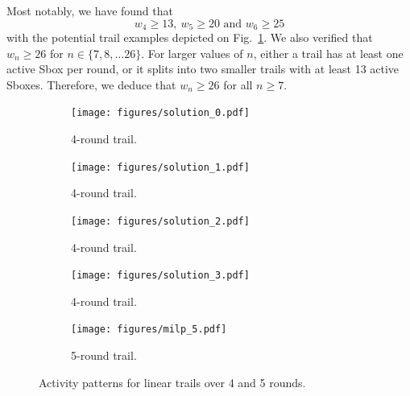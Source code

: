 Most notably, we have found that
\[w_4 \geq 13,\  w_5 \geq 20 \mbox{ and } w_6 \geq 25\]
with the potential trail examples depicted on Fig.~\ref{fig:trails}.
We also verified that \(w_n \geq 26\) for $n \in \{7, 8, \ldots 26\}$.
For larger values of $n$, either a trail has at least one active Sbox per
round, or it splits into two smaller trails with at least 13 active
Sboxes.  Therefore, we deduce that \(w_n \ge 26\) for all $n \ge 7$.

\begin{figure}[h]
  \centering
  \begin{subfigure}[t]{0.22\textwidth}
    \centering
    \texttt{[image: figures/solution\_0.pdf]}
    \caption{4-round trail.}
  \end{subfigure}
  \hfill
  \begin{subfigure}[t]{0.22\textwidth}
    \centering
    \texttt{[image: figures/solution\_1.pdf]}
    \caption{4-round trail.}
  \end{subfigure}
  \hfill
  \begin{subfigure}[t]{0.22\textwidth}
    \centering
    \texttt{[image: figures/solution\_2.pdf]}
    \caption{4-round trail.}
  \end{subfigure}
  \hfill
  \begin{subfigure}[t]{0.22\textwidth}
    \centering
    \texttt{[image: figures/solution\_3.pdf]}
    \caption{4-round trail.}
  \end{subfigure}
  
  \begin{subfigure}[t]{0.45\textwidth}
    \centering
    \texttt{[image: figures/milp\_5.pdf]}
    \caption{5-round trail.}
  \end{subfigure}
  \caption{Activity patterns for linear trails over 4 and 5 rounds.}
  \label{fig:trails}
\end{figure}




